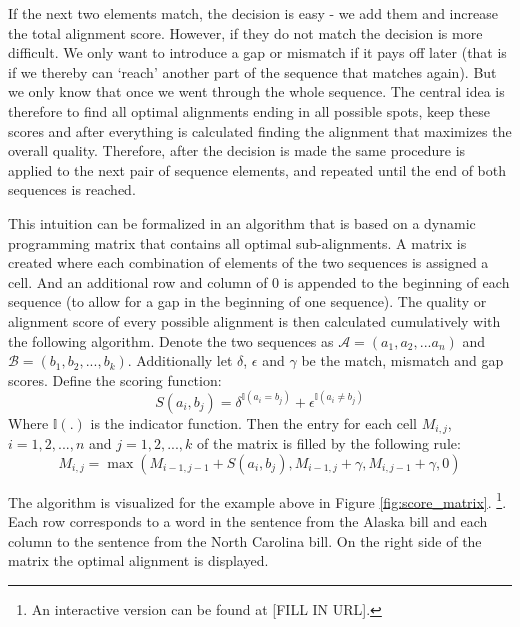 \documentclass[12pt]{article} %
\begin{document}
If the next two elements match, the decision is easy - we add them and increase the total alignment score. However, if they do not match the decision is more difficult. We only want to introduce a gap or mismatch if it pays off later (that is if we thereby can `reach' another part of the sequence that matches again). But we only know that once we went through the whole sequence. The central idea is therefore to find all optimal alignments ending in all possible spots, keep these scores and after everything is calculated finding the alignment that maximizes the overall quality. Therefore, after the decision is made the same procedure is applied to the next pair of sequence elements, and repeated until the end of both sequences is reached.

This intuition can be formalized in an algorithm that is based on a dynamic programming matrix that contains all optimal sub-alignments. A matrix is created where each combination of elements of the two sequences is assigned a cell. And an additional row and column of 0 is appended to the beginning of each sequence (to allow for a gap in the beginning of one sequence). The quality or alignment score of every possible alignment is then calculated cumulatively with the following algorithm. Denote the two sequences as $\mathcal{A} = (a_1, a_2, ... a_n)$ and $\mathcal{B} = (b_1, b_2, ..., b_k)$. Additionally let $\delta$, $\epsilon$ and $\gamma$ be the match, mismatch and gap scores. Define the scoring function:
\begin{equation}
	\label{eqn:scoring}
	S(a_i, b_j) = \delta^{\mathbb{I}(a_i = b_j)} + \epsilon^{\mathbb{I}(a_i \neq b_j)}
\end{equation} 
Where $\mathbb{I}(.)$ is the indicator function. Then the entry for each cell $M_{i,j}$, $i=1,2,...,n$ and $j=1,2,...,k$ of the matrix is filled by the following rule:
\begin{equation}
	\label{eqn:fill}
	M_{i,j} = \max(M_{i-1,j-1} + S(a_i, b_j), M_{i-1,j} + \gamma, M_{i,j-1} + \gamma, 0)
\end{equation}

The algorithm is visualized for the example above in Figure \ref{fig:score_matrix}. \footnote{An interactive version can be found at [FILL IN URL].}. Each row corresponds to a word in the sentence from the Alaska bill and each column to the sentence from the North Carolina bill. On the right side of the matrix the optimal alignment is displayed.
\end{document}
